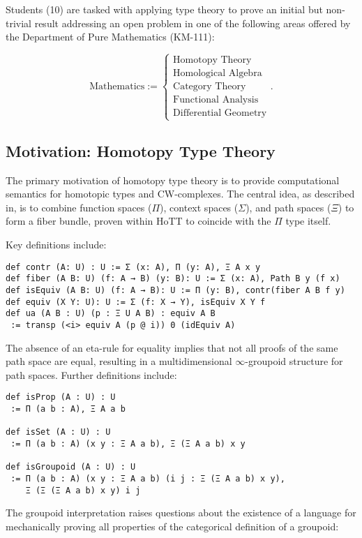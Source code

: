 \documentclass{article}
\theoremstyle{definition}
\begin{document}
Students (10) are tasked with applying type theory to prove an initial
but non-trivial result addressing an open problem in one of the following
areas offered by the Department of Pure Mathematics (KM-111):

\[
\text{Mathematics} :=
\begin{cases}
\text{Homotopy Theory} \\
\text{Homological Algebra} \\
\text{Category Theory} \\
\text{Functional Analysis} \\
\text{Differential Geometry}
\end{cases} .
\]


\newpage
\subsection{Motivation: Homotopy Type Theory}
The primary motivation of homotopy type theory is to provide computational
semantics for homotopic types and CW-complexes. The central idea, as
described in, is to combine function spaces (\(\Pi\)),
context spaces (\(\Sigma\)), and path spaces (\(\Xi\)) to form a fiber bundle, proven within HoTT to coincide with the $\Pi$ type itself.

Key definitions include:

\begin{lstlisting}
def contr (A: U) : U := Σ (x: A), Π (y: A), Ξ A x y
def fiber (A B: U) (f: A → B) (y: B): U := Σ (x: A), Path B y (f x)
def isEquiv (A B: U) (f: A → B): U := Π (y: B), contr(fiber A B f y)
def equiv (X Y: U): U := Σ (f: X → Y), isEquiv X Y f
def ua (A B : U) (p : Ξ U A B) : equiv A B
 := transp (<i> equiv A (p @ i)) 0 (idEquiv A)
\end{lstlisting}

The absence of an eta-rule for equality implies that not all proofs of the
same path space are equal, resulting in a multidimensional \(\infty\)-groupoid
structure for path spaces. Further definitions include:

\begin{lstlisting}
def isProp (A : U) : U
 := Π (a b : A), Ξ A a b

def isSet (A : U) : U
 := Π (a b : A) (x y : Ξ A a b), Ξ (Ξ A a b) x y

def isGroupoid (A : U) : U
 := Π (a b : A) (x y : Ξ A a b) (i j : Ξ (Ξ A a b) x y),
    Ξ (Ξ (Ξ A a b) x y) i j
\end{lstlisting}

The groupoid interpretation raises questions about the existence of a language for
mechanically proving all properties of the categorical definition of a groupoid:
\end{document}

